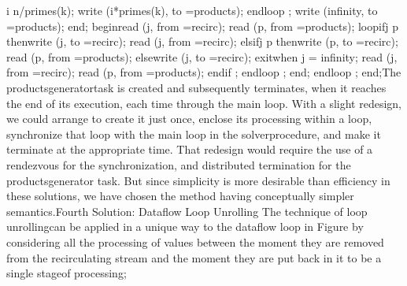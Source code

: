 \tyxtstxendbf[] i \Symgt[] n/primes(k);
               write (i*primes(k), to =\Symgt[] products);
            \tyxtstxbf[]end\tyxtstxendbf[] \tyxtstxbf[]loop%
\tyxtstxendbf[];
            write (infinity, to =\Symgt[] products);
         \tyxtstxbf[]end\tyxtstxendbf[];
      \tyxtstxbf[]begin\tyxtstxendbf[]
         read (j, from =\Symgt[] recirc);
         read (p, from =\Symgt[] products);
         \tyxtstxbf[]loop\tyxtstxendbf[]
            \tyxtstxbf[]if\tyxtstxendbf[]    j \Symlt[] p %
\tyxtstxbf[]then\tyxtstxendbf[]
               write (j, to   =\Symgt[] recirc);
               read  (j, from =\Symgt[] recirc);
            \tyxtstxbf[]elsif\tyxtstxendbf[] j \Symgt[] p %
\tyxtstxbf[]then\tyxtstxendbf[]
               write (p, to   =\Symgt[] recirc);
               read  (p, from =\Symgt[] products);
            \tyxtstxbf[]else\tyxtstxendbf[]
               write (j, to   =\Symgt[] recirc);
         \tyxtstxbf[]exit\tyxtstxendbf[] \tyxtstxbf[]when%
\tyxtstxendbf[] j = infinity;
               read  (j, from =\Symgt[] recirc);
               read  (p, from =\Symgt[] products);
            \tyxtstxbf[]end\tyxtstxendbf[] \tyxtstxbf[]if%
\tyxtstxendbf[];
         \tyxtstxbf[]end\tyxtstxendbf[] \tyxtstxbf[]loop%
\tyxtstxendbf[];
      \tyxtstxbf[]end\tyxtstxendbf[];
   \tyxtstxbf[]end\tyxtstxendbf[] \tyxtstxbf[]loop%
\tyxtstxendbf[];
\tyxtstxbf[]end\tyxtstxendbf[];\Endcomp[]
\EndParbox[]
\FgEndblock[]
 The \tyxffmxmono[]products\Symuns[]generator\tyxffmxendmono[] task
is created and subsequently terminates, when it
\TyPbrkNewp[]
 reaches the end of its execution, each time through the main loop.
With a slight redesign, we could arrange to create it just once, enclose
its processing within a loop, synchronize that loop with the main
loop in the \tyxffmxmono[]solver\tyxffmxendmono[] procedure, and make
it terminate at the appropriate time. That redesign would require
the use of a rendezvous for the synchronization, and distributed termination
for the \tyxffmxmono[]products\Symuns[]generator%
\tyxffmxendmono[] task. But since simplicity is more desirable than
efficiency in these solutions, we have chosen the method having conceptually
simpler semantics.\Endpara[]
\DivEndiv[]
\DivLiv[]\HdMinLiv[]Fourth Solution: Dataflow Loop Unrolling%
\HdMinEndiv[]
\Para[]The technique of \ldquo[]loop unrolling\rdquo[] can be applied
in a unique way to the dataflow loop in Figure 
by considering all the processing of  values between the moment they
are removed from the recirculating stream and the moment they are
put back in it to be a single \ldquo[]stage\rdquo[] of processing;
